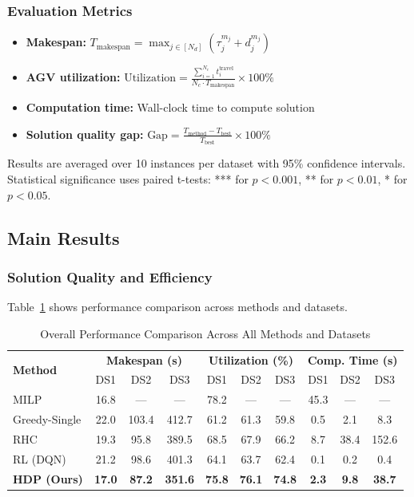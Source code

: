\documentclass[manuscript,screen,review]{acmart}
\begin{document}
\subsubsection{Evaluation Metrics}

\begin{itemize}[leftmargin=*, itemsep=3pt]
    \item \textbf{Makespan:} $T_{\text{makespan}} = \max_{j \in [N_d]} (\tau_j^{m_j} + d_j^{m_j})$
    
    \item \textbf{AGV utilization:} $\text{Utilization} = \frac{\sum_{i=1}^{N_c} t_i^{\text{travel}}}{N_c \cdot T_{\text{makespan}}} \times 100\%$
    
    \item \textbf{Computation time:} Wall-clock time to compute solution
    
    \item \textbf{Solution quality gap:} $\text{Gap} = \frac{T_{\text{method}} - T_{\text{best}}}{T_{\text{best}}} \times 100\%$
\end{itemize}

Results are averaged over 10 instances per dataset with 95\% confidence intervals. 
Statistical significance uses paired t-tests: *** for $p < 0.001$, ** for 
$p < 0.01$, * for $p < 0.05$.

\subsection{Main Results}

\subsubsection{Solution Quality and Efficiency}

Table~\ref{tab:main_results} shows performance comparison across methods 
and datasets.

\begin{table}[t]
\centering
\caption{Overall Performance Comparison Across All Methods and Datasets}
\label{tab:main_results}
\small
\begin{tabular}{l|ccc|ccc|ccc}
\toprule
\multirow{2}{*}{\textbf{Method}} & \multicolumn{3}{c|}{\textbf{Makespan (s)}} & \multicolumn{3}{c|}{\textbf{Utilization (\%)}} & \multicolumn{3}{c}{\textbf{Comp. Time (s)}} \\
& DS1 & DS2 & DS3 & DS1 & DS2 & DS3 & DS1 & DS2 & DS3 \\
\midrule
MILP & 16.8 & --- & --- & 78.2 & --- & --- & 45.3 & --- & --- \\
Greedy-Single & 22.0 & 103.4 & 412.7 & 61.2 & 61.3 & 59.8 & 0.5 & 2.1 & 8.3 \\
RHC & 19.3 & 95.8 & 389.5 & 68.5 & 67.9 & 66.2 & 8.7 & 38.4 & 152.6 \\
RL (DQN) & 21.2 & 98.6 & 401.3 & 64.1 & 63.7 & 62.4 & 0.1 & 0.2 & 0.4 \\
\midrule
\textbf{HDP (Ours)} & \textbf{17.0} & \textbf{87.2} & \textbf{351.6} & \textbf{75.8} & \textbf{76.1} & \textbf{74.8} & \textbf{2.3} & \textbf{9.8} & \textbf{38.7} \\
\bottomrule
\end{tabular}
\end{table}
\end{document}
